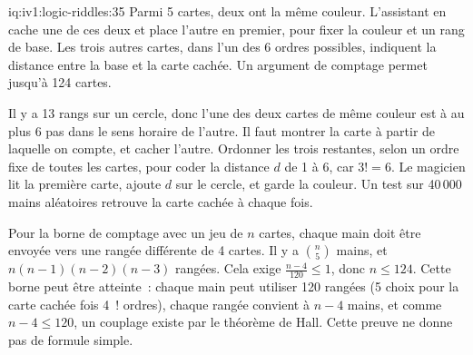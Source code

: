 \begin{solution}{iq:iv1:logic-riddles:35}
Parmi 5 cartes, deux ont la même couleur. L'assistant en cache une de ces deux et place l'autre en premier, pour fixer la couleur et un rang de base. Les trois autres cartes, dans l'un des 6 ordres possibles, indiquent la distance entre la base et la carte cachée. Un argument de comptage permet jusqu'à 124 cartes.

Il y a 13 rangs sur un cercle, donc l'une des deux cartes de même couleur est à au plus 6 pas dans le sens horaire de l'autre. Il faut montrer la carte à partir de laquelle on compte, et cacher l'autre. Ordonner les trois restantes, selon un ordre fixe de toutes les cartes, pour coder la distance $d$ de 1 à 6, car $3! = 6$. Le magicien lit la première carte, ajoute $d$ sur le cercle, et garde la couleur. Un test sur 40\,000 mains aléatoires retrouve la carte cachée à chaque fois.

Pour la borne de comptage avec un jeu de $n$ cartes, chaque main doit être envoyée vers une rangée différente de 4 cartes. Il y a $\binom{n}{5}$ mains, et $n(n - 1)(n - 2)(n - 3)$ rangées. Cela exige $\frac{n - 4}{120} \le 1$, donc $n \le 124$. Cette borne peut être atteinte~: chaque main peut utiliser 120 rangées (5 choix pour la carte cachée fois 4~! ordres), chaque rangée convient à $n - 4$ mains, et comme $n - 4 \le 120$, un couplage existe par le théorème de Hall. Cette preuve ne donne pas de formule simple.

\end{solution}

